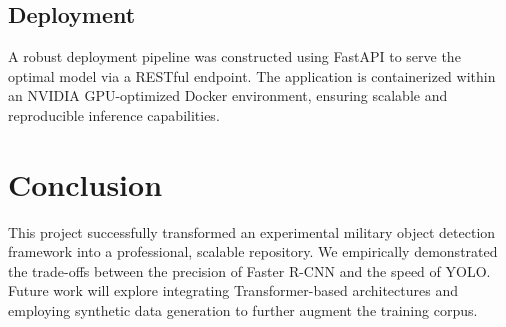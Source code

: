 \documentclass[conference]{IEEEtran}
\begin{document}
\subsection{Deployment}
A robust deployment pipeline was constructed using FastAPI to serve the optimal model via a RESTful endpoint. The application is containerized within an NVIDIA GPU-optimized Docker environment, ensuring scalable and reproducible inference capabilities.

\section{Conclusion}
This project successfully transformed an experimental military object detection framework into a professional, scalable repository. We empirically demonstrated the trade-offs between the precision of Faster R-CNN and the speed of YOLO. Future work will explore integrating Transformer-based architectures and employing synthetic data generation to further augment the training corpus.
\end{document}
